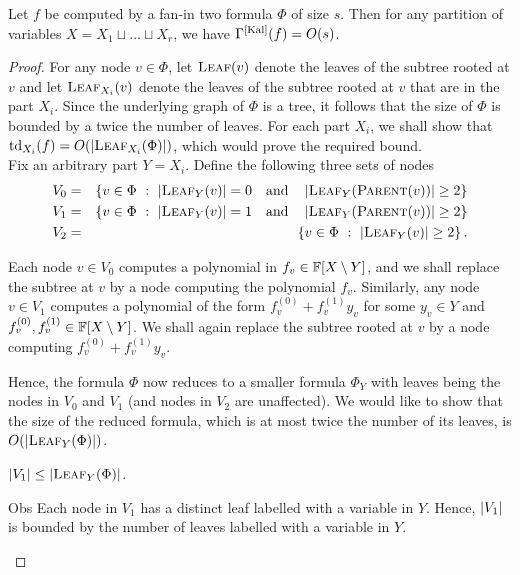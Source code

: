 \begin{lemma}\label{lem:kal-upperbound}
  Let $f$ be computed by a fan-in two formula $\Phi$ of size $s$. 
Then
  for any partition of variables $X = X_1\sqcup \dots \sqcup X_r$, we
  have $\Gamma^{\mathrm{[Kal]}}(f) = O(s)$.
\end{lemma}
\begin{proof}
  For any node $v\in \Phi$, let $\textsc{Leaf}(v)$ denote the leaves
  of the subtree rooted at $v$ and let $\textsc{Leaf}_{X_i}(v)$ denote
  the leaves of the subtree rooted at $v$ that are in the part
  $X_i$. 
Since the underlying graph of $\Phi$ is a tree, it follows
  that the size of $\Phi$ is bounded by a twice the number of
  leaves. 
For each part $X_i$, we shall show that
  $\mathrm{td}_{X_i}(f) = O(\left|\textsc{Leaf}_{X_i}(\Phi)\right|)$, which
  would prove the required bound. \\

  Fix an arbitrary part $Y = X_i$. 
Define the following three 
  sets of nodes
  \begin{eqnarray*}
    V_0 & = & \left\{{v\in \Phi}\ : \ {\left|\textsc{Leaf}_{Y}(v)\right| = 0 \quad\text{and}\quad \left|\textsc{Leaf}_{Y}(\textsc{Parent}(v))\right| \geq 2}\right\}\\
    V_1 & = & \left\{{v\in \Phi}\ : \ {\left|\textsc{Leaf}_{Y}(v)\right| = 1 \quad\text{and}\quad \left|\textsc{Leaf}_{Y}(\textsc{Parent}(v))\right| \geq 2}\right\}\\
    V_2 & = & \left\{{v\in \Phi}\ : \ {\left|\textsc{Leaf}_{Y}(v)\right| \geq 2}\right\}.
  \end{eqnarray*}

  Each node $v\in V_0$ computes a polynomial in $f_v \in
  \mathbb{F}[X\setminus Y]$, and we shall replace the subtree at $v$ by a node
  computing the polynomial $f_v$. 
Similarly, any node $v\in V_1$
  computes a polynomial of the form $f^{(0)}_v + f^{(1)}_v y_v$ for some $y_v\in Y$
  and $f^{(0)}_v, f^{(1)}_v \in \mathbb{F}[X\setminus Y]$. 
We shall again replace the
  subtree rooted at $v$ by a node computing $f^{(0)}_v + f^{(1)}_v y_v$. 

  Hence, the formula $\Phi$ now reduces to a smaller formula $\Phi_Y$ with
  leaves  being the nodes in $V_0$ and $V_1$ (and nodes in $V_2$ are
  unaffected). 
We would like to show that the size of the reduced
  formula, which is at most twice the number of its leaves, is
  $O(\left|\textsc{Leaf}_Y(\Phi)\right|)$.

  \begin{observation}\label{obs:v1-bound}$\left|V_1\right| \leq \left|\textsc{Leaf}_Y(\Phi)\right|$.    
  \end{observation}
  \begin{myproof}{Obs}
    Each node in $V_1$ has a distinct leaf labelled with a variable in
    $Y$. 
Hence, $\left|V_1\right|$ is bounded by the number of leaves
    labelled with a variable in $Y$.
  \end{myproof}
  

\end{proof}
